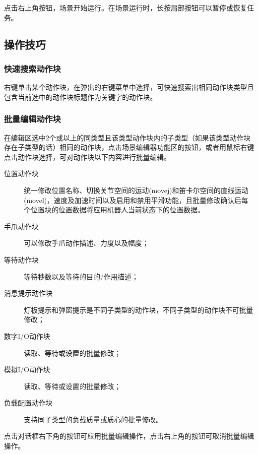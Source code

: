 点击右上角按钮，场景开始运行。在场景运行时，长按肩部按钮可以暂停或恢复任务。



\subsection{操作技巧}
\subsubsection{快速搜索动作块}
右键单击某个动作块，在弹出的右键菜单中选择，可快速搜索出相同动作块类型且包含当前选中的动作块标题作为关键字的动作块。
\subsubsection{批量编辑动作块}
在编辑区选中2个或以上的同类型且该类型动作块内的子类型（如果该类型动作块存在子类型的话）相同的动作块，点击场景编辑器功能区的按钮，或者用鼠标右键点击动作块选择，可对动作块以下内容进行批量编辑。

\begin{description}
\item [位置动作块] 统一修改位置名称、切换关节空间的运动(movej)和笛卡尔空间的直线运动(movel)，速度及加速时间以及启用和禁用平滑功能，且批量修改确认后每个位置块的位置数据将应用机器人当前状态下的位置数据。
\item [手爪动作块] 可以修改手爪动作描述、力度以及幅度；
\item [等待动作块] 等待秒数以及等待的目的/作用描述；
\item [消息提示动作块] 灯板提示和弹窗提示是不同子类型的动作块，不同子类型的动作块不可批量修改；
\item [数字I/O动作块] 读取、等待或设置的批量修改；
\item [模拟I/O动作块] 读取、等待或设置的批量修改；
\item [负载配置动作块] 支持同子类型的负载质量或质心的批量修改。
\end{description}

点击对话框右下角的按钮可应用批量编辑操作，点击右上角的\kbd{$\times$}按钮可取消批量编辑操作。


